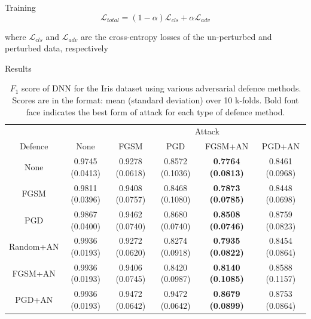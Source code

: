 \documentclass[smaller]{beamer}
\begin{document}
\begin{frame}[label={sec:org4a0a3bb}]{Training}
\[
\mathcal{L}_{total} = (1 - \alpha) \mathcal{L}_{cls} + \alpha \mathcal{L}_{adv}
\]

where \(\mathcal{L}_{cls}\) and \(\mathcal{L}_{adv}\) are the cross-entropy
losses of the un-perturbed and perturbed data, respectively
\end{frame}

\begin{frame}[label={sec:org2df916c}]{Results}
\begin{table}

\caption{\label{tab:irir_results}$F_1$ score of DNN for the Iris dataset using various adversarial defence methods. Scores are in the format: mean (standard deviation) over 10 k-folds. Bold font face indicates the best form of attack for each type of defence method.}
\centering
\begin{adjustbox}{center}
\begin{tabular}[t]{cccccc}
\toprule
\multicolumn{2}{c}{ } & \multicolumn{4}{c}{Attack} \\
\cmidrule(l{3pt}r{3pt}){3-6}
Defence & None & FGSM & PGD & FGSM+AN & PGD+AN\\
\midrule
None & 0.9745 (0.0413) & 0.9278 (0.0618) & 0.8572 (0.1036) & \textbf{0.7764 (0.0813)} & 0.8461 (0.0968)\\
FGSM & 0.9811 (0.0396) & 0.9408 (0.0757) & 0.8468 (0.1080) & \textbf{0.7873 (0.0785)} & 0.8448 (0.0698)\\
PGD & 0.9867 (0.0400) & 0.9462 (0.0740) & 0.8680 (0.0740) & \textbf{0.8508 (0.0746)} & 0.8759 (0.0823)\\
\midrule
Random+AN & 0.9936 (0.0193) & 0.9272 (0.0620) & 0.8274 (0.0918) & \textbf{0.7935 (0.0822)} & 0.8454 (0.0864)\\
FGSM+AN & 0.9936 (0.0193) & 0.9406 (0.0745) & 0.8420 (0.0987) & \textbf{0.8140 (0.1085)} & 0.8588 (0.1157)\\
PGD+AN & 0.9936 (0.0193) & 0.9472 (0.0642) & 0.9472 (0.0642) & \textbf{0.8679 (0.0899)} & 0.8753 (0.0864)\\
\bottomrule
\end{tabular}
\end{adjustbox}
\end{table}
\end{frame}
\end{document}
